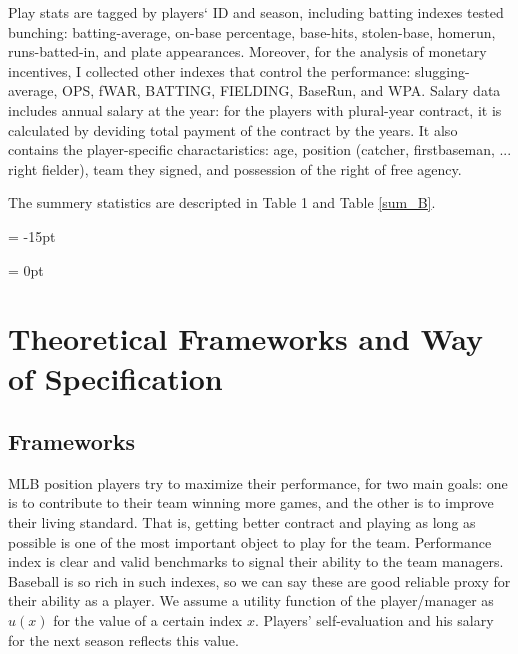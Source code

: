 \documentclass[dvipdfmx, 12pt]{article}
\begin{document}
Play stats are tagged by players` ID and season, including batting indexes tested bunching: batting-average, on-base percentage, base-hits, stolen-base, homerun, runs-batted-in, and plate appearances. Moreover,  for the analysis of monetary incentives, I collected other indexes that control the performance: slugging-average, OPS, fWAR, BATTING, FIELDING, BaseRun, and WPA. Salary data includes annual salary at the year: for the players with plural-year contract, it is calculated by deviding total payment of the contract by the years. It also contains the player-specific charactaristics: age, position (catcher, firstbaseman, ... right fielder), team they signed, and possession of the right of free agency.

The summery statistics are descripted in Table 1 and Table \ref{sum_B}.

\begin{table}[H]
  
\end{table}

\leftskip = -15pt
\begin{table}[H]
  
\end{table}
\leftskip = 0pt

\section{Theoretical Frameworks and Way of Specification}

\subsection{Frameworks}

MLB position players try to maximize their performance, for two main goals: one is to contribute to their team winning more games, and the other is to improve their living standard. That is, getting better contract and playing as long as possible is one of the most important object to play for the team. Performance index is clear and valid benchmarks to signal their ability to the team managers. Baseball is so rich in such indexes, so we can say these are good reliable proxy for their ability as a player. We assume a utility function of the player/manager as $u(x)$ for the value of a certain index $x$. Players' self-evaluation and his salary for the next season reflects this value.
\end{document}
